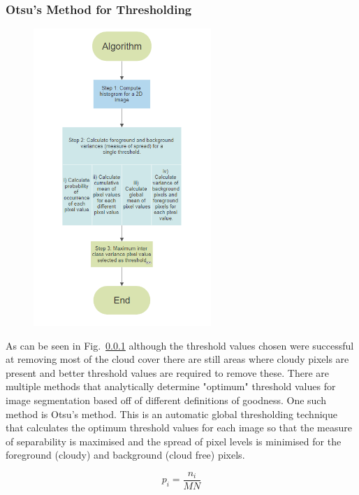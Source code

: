 \subsubsection{Otsu's Method for Thresholding}
\begin{figure}
\centering
    \includegraphics[width=0.6\textwidth]{flowchart_otsu.png}
    \caption{\label{diagram}}
\end{figure}

As can be seen in Fig.~\ref{} although the threshold values chosen were successful at removing most of the cloud cover there are still areas where cloudy pixels are present and better threshold values are required to remove these. There are multiple methods that analytically determine "optimum" threshold values for image segmentation based off of different definitions of goodness. One such method is Otsu's method. This is an automatic global thresholding technique that calculates the optimum threshold values for each image so that the measure of separability is maximised and the spread of pixel levels is minimised for the foreground (cloudy) and background (cloud free) pixels.



\begin{equation}
p_{i}=\frac{n_{i}}{M N}
\end{equation}


